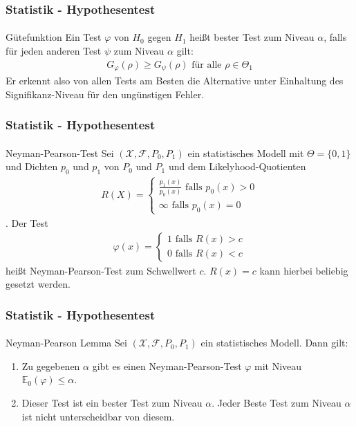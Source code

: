 \documentclass{beamer}
\begin{document}
\begin{frame}
    \frametitle{Statistik - Hypothesentest}
\framesubtitle{}
\begin{block}{Gütefunktion}
Ein Test $\varphi$ von $H_0$ gegen $H_1$ heißt bester Test zum Niveau $\alpha$, falls für jeden anderen Test $\psi$ zum 
 Niveau $\alpha$ gilt:
\begin{align*}
G_{\varphi}(\rho) \geq G_{\psi}(\rho) \text{ für alle } \rho \in \Theta_1
\end{align*}
Er erkennt also von allen Tests am Besten die Alternative unter Einhaltung  des Signifikanz-Niveau für den ungünstigen Fehler.
\end{block}

 \end{frame}



\begin{frame}
    \frametitle{Statistik - Hypothesentest}
\framesubtitle{}
\begin{block}{Neyman-Pearson-Test}
Sei   $(\mathcal{X}, \mathcal{F}, P_0, P_1)$ ein statistisches Modell mit $\Theta = \{ 0,1\}$ und Dichten $p_0$ und $p_1$ von $P_0$ und $P_1$ und dem Likelyhood-Quotienten
 \begin{align*}
 R(X) = \begin{cases} \frac{p_1(x)}{p_0(x)} \text{ falls } p_0(x) > 0 \\ \infty  \text{ falls } p_0(x) = 0 \end{cases}
\end{align*}. 
Der Test 
\begin{align*}
 \varphi(x) = \begin{cases} 1 \text{ falls } R(x) > c \\ 0  \text{ falls } R(x) < c \end{cases}
\end{align*}
heißt Neyman-Pearson-Test zum Schwellwert $c$. $R(x) = c$ kann hierbei beliebig gesetzt werden.
\end{block}

 \end{frame}


\begin{frame}
    \frametitle{Statistik - Hypothesentest}
\framesubtitle{}
\begin{block}{Neyman-Pearson Lemma}
Sei   $(\mathcal{X}, \mathcal{F}, P_0, P_1)$ ein statistisches Modell. Dann gilt:
\begin{enumerate}
\item Zu gegebenen $\alpha$ gibt es einen Neyman-Pearson-Test  $\varphi$ mit Niveau $\mathbb{E}_0(\varphi) \leq \alpha$.
\item Dieser Test ist ein bester Test zum Niveau $\alpha$. Jeder Beste Test   zum Niveau $\alpha$ ist nicht unterscheidbar von diesem.
\end{enumerate}
\end{block}

 \end{frame}
\end{document}
